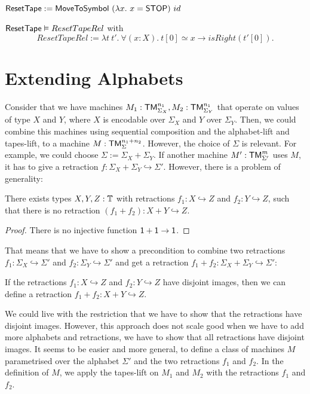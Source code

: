 \begin{definition}[$\MS{ResetTape}$]
  \label{def:Reset}
  $\mathsf{ResetTape} := \mathsf{MoveToSymbol}~(\lambda x.~x=\mathsf{STOP})~id$
\end{definition}

\begin{lemma}
  \label{lem:Reset_Realise}
  $\mathsf{ResetTape} \mathrel{\vDash} ResetTapeRel$ with
  \[
    ResetTapeRel := \lambda t~t'.~\forall(x:X).~t[0] \simeq x \rightarrow isRight(t'[0]).
  \]
\end{lemma}


\section{Extending Alphabets}
\label{sec:extend-alphabet}

Consider that we have machines $M_1 : \mathsf{TM}_{\Sigma_X}^{n_1}, M_2 : \mathsf{TM}_{\Sigma_Y}^{n_1}$ that operate on values of type $X$ and $Y$, where $X$ is
encodable over $\Sigma_X$ and $Y$ over $\Sigma_Y$.  Then, we could combine this machines using sequential composition and the alphabet-lift and
tapes-lift, to a machine $M : \mathsf{TM}_\Sigma^{n_1+n_2}$.  However, the choice of $\Sigma$ is relevant.  For example, we could choose
$\Sigma := \Sigma_X + \Sigma_Y$.  If another machine $M' : \mathsf{TM}_{\Sigma'}^m$ uses $M$, it has to give a retraction
$f : \Sigma_X+\Sigma_Y \hookrightarrow \Sigma'$.  However, there is a problem of generality:
\begin{fact}
  There exists types $X,Y,Z:\mathbb{T}$ with retractions $f_1 : X \hookrightarrow Z$ and $f_2 : Y \hookrightarrow Z$, such that there is no retraction
  $(f_1+f_2) : X+Y \hookrightarrow Z$.
\end{fact}
\begin{proof}
  There is no injective function $\mathsf{1}+\mathsf{1}\rightarrow\mathsf{1}$.
\end{proof}

That means that we have to show a precondition to combine two retractions $f_1 : \Sigma_X \hookrightarrow \Sigma'$ and
$f_2 : \Sigma_Y \hookrightarrow \Sigma'$ and get a retraction $f_1+f_2 : \Sigma_X + \Sigma_Y \hookrightarrow \Sigma'$:
\begin{fact}
  If the retractions $f_1 : X \hookrightarrow Z$ and $f_2 : Y \hookrightarrow Z$ have disjoint images, then we can define a retraction
  $f_1+f_2 : X+Y \hookrightarrow Z$.
\end{fact}

We could live with the restriction that we have to show that the retractions have disjoint images.  However, this approach does not scale good when we
have to add more alphabets and retractions, we have to show that all retractions have disjoint images.  It seems to be easier and more general, to
define a class of machines $M$ parametrised over the alphabet $\Sigma'$ and the two retractions $f_1$ and $f_2$.  In the definition of $M$, we apply
the tapes-lift on $M_1$ and $M_2$ with the retractions $f_1$ and $f_2$.



